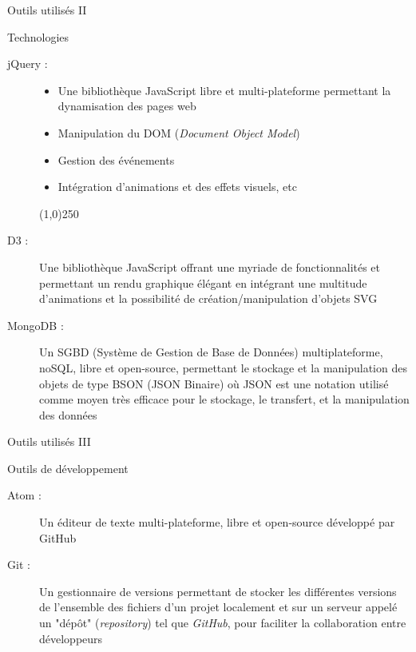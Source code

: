 \documentclass{bredelebeamer}
\begin{document}
  \begin{frame}{Outils utilisés II}
    \begin{block}{Technologies}
      \begin{description}
        \item[jQuery :] {
          \begin{itemize}
            \item {Une bibliothèque JavaScript libre et multi-plateforme permettant la dynamisation des pages web}
            \pause
            \item {Manipulation du DOM (\textit{Document Object Model})}
            \pause
            \item {Gestion des événements}
            \pause
            \item {Intégration d'animations et des effets visuels, etc}
          \end{itemize}
        }
        \pause
        \begin{center}
          \line(1,0){250}
        \end{center}
        \item [D3 :]{
        Une bibliothèque JavaScript offrant une myriade de fonctionnalités et permettant un rendu graphique élégant en intégrant une multitude d'animations et la possibilité de création/manipulation d'objets SVG
        }
        \pause
        \item [MongoDB :]{
          Un SGBD (Système de Gestion de Base de Données) multiplateforme, noSQL, libre et open-source, permettant le stockage et la manipulation des objets de type BSON (JSON Binaire) où JSON est une notation utilisé comme moyen très efficace pour le stockage, le transfert, et la manipulation des données
        }
      \end{description}
    \end{block}
  \end{frame}

  \begin{frame}{Outils utilisés III}
    \begin{block}{Outils de développement}
      \begin{description}
        \item [Atom :]{
          Un éditeur de texte multi-plateforme, libre et open-source développé par GitHub
        }
        \pause
        \item [Git :]{
          Un gestionnaire de versions permettant de stocker les différentes versions de l'ensemble des fichiers d'un projet localement et sur un serveur appelé un "dépôt" (\textit{repository}) tel que \textit{GitHub}, pour faciliter la collaboration entre développeurs
        }
      \end{description}
    \end{block}
  \end{frame}
\end{document}
